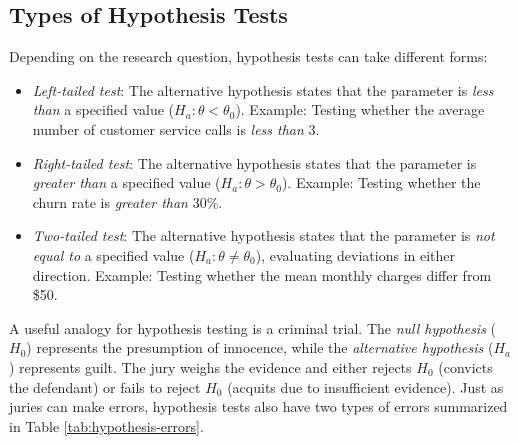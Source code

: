 \documentclass[
]{book}
\providecommand{\tightlist}{%
  \setlength{\itemsep}{0pt}\setlength{\parskip}{0pt}}
\theoremstyle{definition}
\theoremstyle{definition}
\theoremstyle{definition}
\theoremstyle{definition}
\theoremstyle{remark}
\begin{document}
\subsection{Types of Hypothesis Tests}\label{types-of-hypothesis-tests}

Depending on the research question, hypothesis tests can take different forms:

\begin{itemize}
\tightlist
\item
  \emph{Left-tailed test}: The alternative hypothesis states that the parameter is \emph{less than} a specified value (\(H_a: \theta < \theta_0\)). Example: Testing whether the average number of customer service calls is \emph{less than} 3.\\
\item
  \emph{Right-tailed test}: The alternative hypothesis states that the parameter is \emph{greater than} a specified value (\(H_a: \theta > \theta_0\)). Example: Testing whether the churn rate is \emph{greater than} 30\%.\\
\item
  \emph{Two-tailed test}: The alternative hypothesis states that the parameter is \emph{not equal to} a specified value (\(H_a: \theta \neq \theta_0\)), evaluating deviations in either direction. Example: Testing whether the mean monthly charges differ from \$50.
\end{itemize}

A useful analogy for hypothesis testing is a criminal trial. The \emph{null hypothesis} (\(H_0\)) represents the presumption of innocence, while the \emph{alternative hypothesis} (\(H_a\)) represents guilt. The jury weighs the evidence and either rejects \(H_0\) (convicts the defendant) or fails to reject \(H_0\) (acquits due to insufficient evidence). Just as juries can make errors, hypothesis tests also have two types of errors summarized in Table \ref{tab:hypothesis-errors}.
\end{document}
